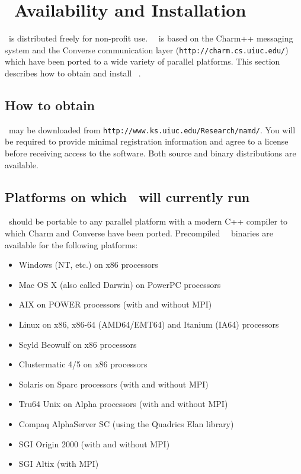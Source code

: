 
\section{\NAMD\ Availability and Installation}
\label{section:avail}

\NAMD\ is distributed freely for non-profit use.
\NAMD\ \NAMDVER\ is based on the Charm++ messaging system and the
Converse communication layer ({\tt http://charm.cs.uiuc.edu/})
which have been ported to a wide variety of parallel platforms.
This section describes how to obtain and install \NAMD\ \NAMDVER.

\subsection{How to obtain \NAMD}

\NAMD\ may be downloaded from {\tt http://www.ks.uiuc.edu/Research/namd/}.
You will be required to provide minimal registration information and
agree to a license before receiving access to the software.
Both source and binary distributions are available.

\subsection{Platforms on which \NAMD\ will currently run}
\NAMD\ should be portable to any parallel platform with a
modern C++ compiler to which Charm and Converse have been ported.
Precompiled \NAMD\ \NAMDVER\ binaries are available for the following platforms:  
\begin{itemize}
\item Windows (NT, etc.) on x86 processors 
\item Mac OS X (also called Darwin) on PowerPC processors
\item AIX on POWER processors (with and without MPI)
\item Linux on x86, x86-64 (AMD64/EMT64) and Itanium (IA64) processors 
\item Scyld Beowulf on x86 processors 
\item Clustermatic 4/5 on x86 processors 
\item Solaris on Sparc processors (with and without MPI)
\item Tru64 Unix on Alpha processors (with and without MPI)
\item Compaq AlphaServer SC (using the Quadrics Elan library)
\item SGI Origin 2000 (with and without MPI) 
\item SGI Altix (with MPI)
\end{itemize}

